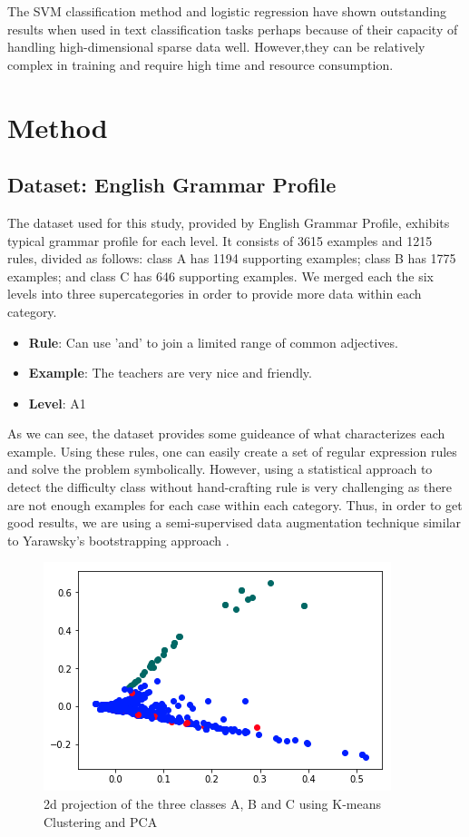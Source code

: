 The SVM classification method and logistic regression have shown outstanding results when used in text classification tasks \citep{Yang1999ARO} \cite{brucher2002document} perhaps because of their capacity of handling high-dimensional sparse data well.  However,they can be relatively complex in training and require high time and resource consumption.



\section{Method}
\label{sec:logistic}

\subsection{Dataset: English Grammar Profile}
The dataset used for this study, provided by English Grammar Profile, exhibits typical grammar profile for each level. It consists of 3615 examples and 1215 rules, divided as follows: class A has 1194 supporting examples; class B has 1775 examples; and class C has 646 supporting examples. We merged each the six levels into three supercategories in order to provide more data within each category. 

\begin{itemize}
	\item \textbf{Rule}: Can use 'and' to join a limited range of common adjectives.
	\item \textbf{Example}: The teachers are very nice and friendly.
	\item \textbf{Level}: A1
\end{itemize}
As we can see, the dataset provides some guideance of what characterizes each example. Using these rules, one can easily create a set of regular expression rules and solve the problem symbolically. However, using a statistical approach to detect the difficulty class without hand-crafting rule is very challenging as there are not enough examples for each case within each category. Thus, in order to get good results, we are using a semi-supervised data augmentation technique similar to Yarawsky's bootstrapping approach \cite{yarowsky_unsupervised_1995}. 

\begin{figure}[t]
	\centering
    \includegraphics[width=.75\linewidth]{../Figures/pca_proj.png} 
	\caption{2d projection of the three classes A, B and C using K-means Clustering and PCA}
	\label{fig:cmdstudy}
\end{figure}

